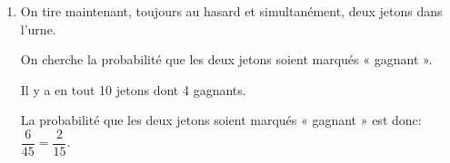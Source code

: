 \documentclass[10pt]{article}
\providecommand{\ds}{\displaystyle}
\begin{document}
\begin{enumerate}
\item On tire maintenant, toujours au hasard et simultanément, deux jetons dans l'urne.

On cherche la probabilité que les deux jetons soient marqués « gagnant ». 



Il y a en tout 10 jetons dont 4 gagnants.


La probabilité que les deux jetons soient marqués « gagnant » est donc: $\dfrac{6}{45} = \dfrac{2}{15}$. 

\end{enumerate}
\end{document}
